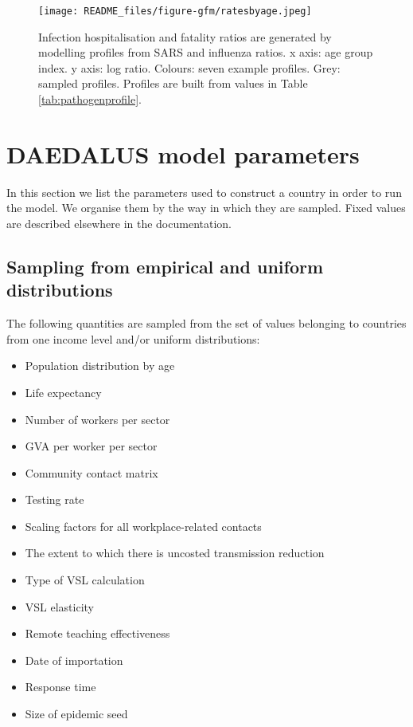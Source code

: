 \documentclass[
]{article}
\providecommand{\tightlist}{%
  \setlength{\itemsep}{0pt}\setlength{\parskip}{0pt}}
\begin{document}
\begin{figure}
\centering
\texttt{[image: README\_files/figure-gfm/ratesbyage.jpeg]}
\caption{\label{fig:ratesbyage} Infection hospitalisation and fatality ratios are generated by modelling profiles from SARS and influenza ratios. x axis: age group index. y axis: log ratio. Colours: seven example profiles. Grey: sampled profiles. Profiles are built from values in Table \ref{tab:pathogenprofile}.}
\end{figure}

\section{DAEDALUS model parameters}\label{daedalus-model-parameters}

In this section we list the parameters used to construct a country in order to run the model. We organise them by the way in which they are sampled. Fixed values are described elsewhere in the documentation.

\subsection{Sampling from empirical and uniform distributions}\label{sampling-from-empirical-and-uniform-distributions}

The following quantities are sampled from the set of values belonging to countries from one income level and/or uniform distributions:

\begin{itemize}
\tightlist
\item
  Population distribution by age
\item
  Life expectancy
\item
  Number of workers per sector
\item
  GVA per worker per sector
\item
  Community contact matrix
\item
  Testing rate
\item
  Scaling factors for all workplace-related contacts
\item
  The extent to which there is uncosted transmission reduction
\item
  Type of VSL calculation
\item
  VSL elasticity
\item
  Remote teaching effectiveness
\item
  Date of importation
\item
  Response time
\item
  Size of epidemic seed
\end{itemize}
\end{document}
